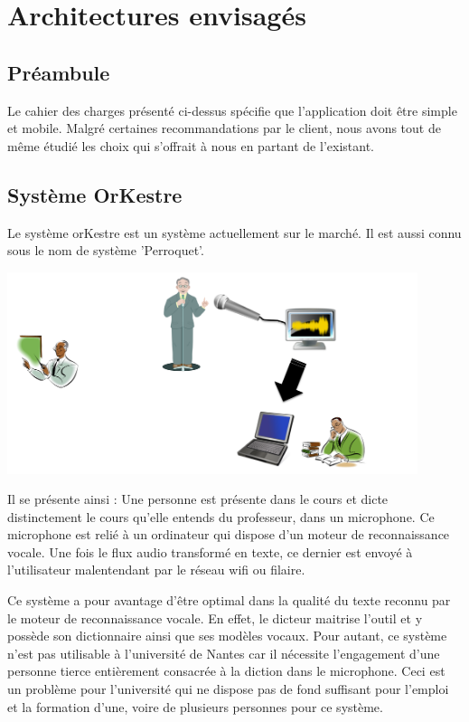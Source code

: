 \chapter{Architectures envisagés}

\section{Préambule}
Le cahier des charges présenté ci-dessus spécifie que l'application doit être
simple et mobile. Malgré certaines recommandations par le client, nous avons
tout de même étudié les choix qui s'offrait à nous en partant de l'existant.

\section{Système OrKestre}

Le système orKestre est un système actuellement sur le marché. Il est aussi
connu sous le nom de système 'Perroquet'.

\includegraphics[width=12cm]{img/orKestre.png} 

Il se présente ainsi : Une personne est présente dans le cours et dicte distinctement le cours qu'elle entends du professeur, dans un microphone. Ce microphone est relié à un ordinateur qui dispose d'un moteur de reconnaissance vocale. Une fois le flux audio transformé en texte, ce dernier est envoyé à l'utilisateur malentendant par le réseau wifi ou filaire.

Ce système a pour avantage d'être optimal dans la qualité du texte reconnu par le moteur de reconnaissance vocale. En effet, le dicteur maitrise l'outil et y possède son dictionnaire ainsi que ses modèles vocaux. 
Pour autant, ce système n'est pas utilisable à l'université de Nantes car il nécessite l'engagement d'une personne tierce entièrement consacrée à la diction dans le microphone. Ceci est un problème pour l'université qui ne dispose pas de fond suffisant pour l'emploi et la formation d'une, voire de plusieurs personnes pour ce système.


